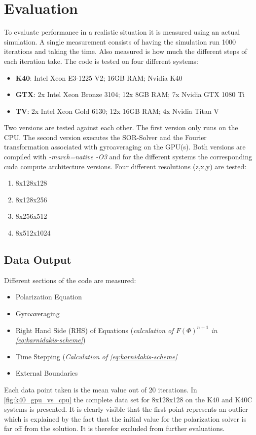 \documentclass[master.tex]{subfiles}
\begin{document}
\section{Evaluation}
To evaluate performance in a realistic situation it is measured using an actual simulation. A single measurement consists of having the simulation run 1000 iterations and taking the time. Also measured is how much the different steps of each iteration take.\newline
The code is tested on four different systems:
\begin{itemize}
    \item \textbf{\ac{K40}}: Intel Xeon E3-1225 V2; 16GB RAM; Nvidia K40
    \item \textbf{\ac{GTX}}: 2x Intel Xeon Bronze 3104; 12x 8GB RAM; 7x Nvidia GTX 1080 Ti
    \item \textbf{\ac{TV}}: 2x Intel Xeon Gold 6130; 12x 16GB RAM; 4x Nvidia Titan V
\end{itemize}
Two versions are tested against each other. The first version only runs on the CPU. The second version executes the \ac{SOR}-Solver and the Fourier transformation associated with gyroaveraging on the GPU(s). Both versions are compiled with \textit{-march=native -O3} and for the different systems the corresponding cuda compute architecture versions. Four different resolutions (z,x,y) are tested:
\begin{enumerate}
    \item 8x128x128
    \item 8x128x256
    \item 8x256x512
    \item 8x512x1024
\end{enumerate}

\subsection{Data Output}
Different sections of the code are measured:
\begin{itemize}
    \item Polarization Equation
    \item Gyroaveraging
    \item Right Hand Side (RHS) of Equations (\textit{calculation of $F(\Phi)^{n+1}$ in \autoref{eq:karnidakis-scheme}})
    \item Time Stepping (\textit{Calculation of \autoref{eq:karnidakis-scheme}}
    \item External Boundaries
\end{itemize}
Each data point taken is the mean value out of 20 iterations. In \autoref{fig:k40_gpu_vs_cpu} the complete data set for 8x128x128 on the \ac{K40} and \ac{K40C} systems is presented. It is clearly visible that the first point represents an outlier which is explained by the fact that the initial value for the polarization solver is far off from the solution. It is therefor excluded from further evaluations. 
\end{document}
